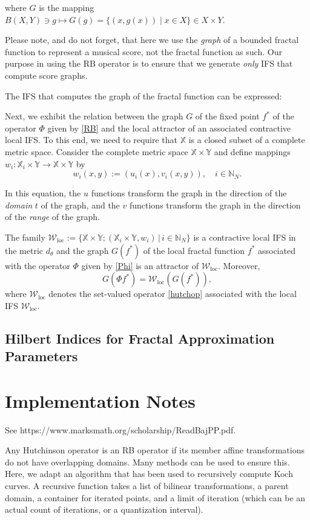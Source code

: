 \documentclass[english,11pt,letterpaper,onecolumn]{scrartcl}
\numberwithin{equation}{section}
\newcommand{\st}{\,|\,}
\newcommand{\N}{\mathbb{N}}
\newcommand{\X}{\mathbb{X}}
\newcommand{\Y}{\mathbb{Y}}
\newcommand{\cW}{\mathcal{W}}
\newcommand{\be}{\begin{equation}}
\newcommand{\ee}{\end{equation}}
\newcommand{\loc}{\mathrm{loc}}
\begin{document}
\noindent where $G$ is the mapping $B(X,Y)\ni g\longmapsto G(g) = \{(x, g(x))\mid x\in X\}\in X\times Y$.

Please note, and do not forget, that here we use the \textit{graph} of a bounded
fractal function to represent a musical score, not the fractal function as such.
Our purpose in using the RB operator is to ensure that we generate \textit{only} IFS
that compute score graphs.

The IFS that computes the graph of the fractal function can be expressed:

Next, we exhibit the relation between the graph $G$ of the fixed point $f^*$ of the operator $\Phi$ given by \eqref{RB} and the local attractor of an associated contractive local IFS. To this end, we need to require that $\X$ is a closed subset of a complete metric space. Consider the complete metric space $\X\times\Y$ and define mappings $w_i:\X_i\times\Y\to\X\times\Y$ by
\[
w_i (x, y) := (u_i (x), v_i (x,y)), \quad i\in \N_N.
\]

In this equation, the $u$ functions transform the graph in the direction of the
\emph{domain} $t$ of the graph, and the $v$ functions transform the graph in the
direction of the \emph{range} of the graph.

The family $\cW_\loc := \{\X\times\Y; (\X_i\times\Y, w_i)\st i\in \N_N\}$ is a contractive local IFS in the metric $d_\theta$ and the graph $G(f^*)$ of the local fractal function $f^*$ associated with the operator $\Phi$ given by \eqref{Phi} is an attractor of $\cW_\loc$. Moreover,
\be\label{GW}
G(\Phi f^*) = \cW_\loc (G(f^*)),
\ee
where $\cW_\loc$ denotes the set-valued operator \eqref{hutchop} associated with the local IFS $\cW_\loc$.


\subsection{Hilbert Indices for Fractal Approximation Parameters}

\section{Implementation Notes}

See https://www.marksmath.org/scholarship/ReadBajPP.pdf.

Any Hutchinson operator is an RB operator if its member affine transformations do not have overlapping domains.
Many methods can be used to ensure this. Here, we adapt an algorithm that has been used to recursively compute
Koch curves. A recursive function takes a list of bilinear transformations, a parent domain, a container for
iterated points, and a limit of iteration (which can be an actual count of iterations, or a quantization interval).
\end{document}
